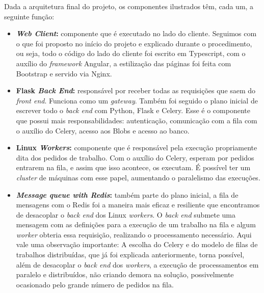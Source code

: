 \documentclass[11pt,twoside]{article}
\begin{document}
Dada a arquitetura final do projeto, os componentes ilustrados têm, cada um, a seguinte função:

\begin{itemize}
  \item \textbf{\emph{Web Client}:} componente que é executado no lado do cliente. Seguimos com o que foi proposto no início do projeto e explicado durante o procedimento, ou seja, todo o código do lado do cliente 
  foi escrito em Typescript, com o auxílio do \emph{framework} Angular, a estilização das páginas foi feita com Bootstrap e servido via Nginx.
  \item \textbf{Flask \emph{Back End}:} responsável por receber todas as requisições que saem do \emph{front end}. Funciona como um \emph{gateway}. Também foi seguido o plano inicial de escrever todo o \emph{back end} com
  Python, Flask e Celery. Esse é o componente que possui mais responsabilidades: autenticação, comunicação com a fila com o auxílio do Celery, acesso aos Blobs e acesso ao banco.
  \item \textbf{Linux \emph{Workers}:} componente que é responsável pela execução propriamente dita dos pedidos de trabalho. Com o auxílio do Celery, esperam por pedidos entrarem na fila, e assim que isso acontece, os executam. 
  É possível ter um \emph{cluster} de máquinas com esse papel, aumentando o paralelismo das execuções.
  \item \textbf{\emph{Message queue with Redis}:} também parte do plano inicial, a fila de mensagens com o Redis foi a maneira mais eficaz e resiliente que encontramos de desacoplar o \emph{back end} dos Linux \emph{workers}.
  O \emph{back end} submete uma mensagem com as definições para a execução de um trabalho na fila e algum \emph{worker} obteria essa requisição, realizando o processamento necessário. Aqui vale uma observação 
  importante: A escolha do Celery e do modelo de filas de trabalhos distribuídas, que já foi explicada anteriormente, torna possível, além de desacoplar o \emph{back end} dos \emph{workers}, a execução de
  processamentos em paralelo e distribuídos, não criando demora na solução, possivelmente ocasionado pelo grande número de pedidos na fila.
  

\end{itemize}
\end{document}
